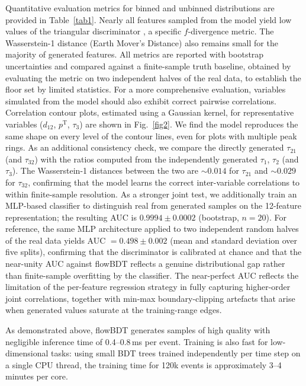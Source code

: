 \documentclass[%
 reprint,
 amsmath,amssymb,
 aps,
prd,
floatfix,
]{revtex4-2}
\begin{document}
Quantitative evaluation metrics for binned and unbinned distributions are provided in Table~\ref{tab1}. Nearly all features sampled from the model yield low values of the triangular discriminator \cite{sep,tmva}, a specific $f$-divergence metric. The Wasserstein-1 distance (Earth Mover's Distance) \cite{emd0,wgan} also remains small for the majority of generated features. All metrics are reported with bootstrap uncertainties and compared against a finite-sample truth baseline, obtained by evaluating the metric on two independent halves of the real data, to establish the floor set by limited statistics. For a more comprehensive evaluation, variables simulated from the model should also exhibit correct pairwise correlations. Correlation contour plots, estimated using a Gaussian kernel, for representative variables ($d_{12}$, $p^\mathrm{T}$, $\tau_3$) are shown in Fig.~\ref{fig2}. We find the model reproduces the same shape on every level of the contour lines, even for plots with multiple peak rings. As an additional consistency check, we compare the directly generated $\tau_{21}$ (and $\tau_{32}$) with the ratios computed from the independently generated $\tau_1$, $\tau_2$ (and $\tau_3$). The Wasserstein-1 distances between the two are $\sim 0.014$ for $\tau_{21}$ and $\sim 0.029$ for $\tau_{32}$, confirming that the model learns the correct inter-variable correlations to within finite-sample resolution. As a stronger joint test, we additionally train an MLP-based classifier to distinguish real from generated samples on the 12-feature representation; the resulting AUC is $0.9994 \pm 0.0002$ (bootstrap, $n=20$). For reference, the same MLP architecture applied to two independent random halves of the real data yields AUC $= 0.498 \pm 0.002$ (mean and standard deviation over five splits), confirming that the discriminator is calibrated at chance and that the near-unity AUC against flowBDT reflects a genuine distributional gap rather than finite-sample overfitting by the classifier. The near-perfect AUC reflects the limitation of the per-feature regression strategy in fully capturing higher-order joint correlations, together with min-max boundary-clipping artefacts that arise when generated values saturate at the training-range edges.

As demonstrated above, flowBDT generates samples of high quality with negligible inference time of 0.4--0.8\,ms per event. Training is also fast for low-dimensional tasks: using small BDT trees trained independently per time step on a single CPU thread, the training time for 120k events is approximately 3--4 minutes per core.
\end{document}
